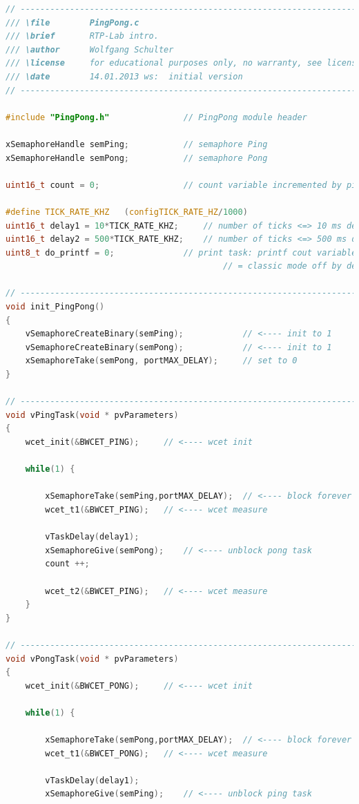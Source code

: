 \os{\newpage}
\begin{lstlisting}[style=mystyle, language=c]
// ----------------------------------------------------------------------------
/// \file		 PingPong.c
/// \brief		 RTP-Lab intro.
/// \author		 Wolfgang Schulter 
/// \license	 for educational purposes only, no warranty, see license.txt
/// \date		 14.01.2013 ws:  initial version
// ----------------------------------------------------------------------------

#include "PingPong.h"  				// PingPong module header

xSemaphoreHandle semPing;			// semaphore Ping
xSemaphoreHandle semPong;			// semaphore Pong

uint16_t count = 0;					// count variable incremented by ping

#define TICK_RATE_KHZ	(configTICK_RATE_HZ/1000)
uint16_t delay1 = 10*TICK_RATE_KHZ;		// number of ticks <=> 10 ms delay as default
uint16_t delay2 = 500*TICK_RATE_KHZ;	// number of ticks <=> 500 ms delay as default
uint8_t do_printf = 0;				// print task: printf cout variable to stdout, if 1
											// = classic mode off by default (we have the GLCD)

// ----------------------------------------------------------------------------
void init_PingPong()
{
	vSemaphoreCreateBinary(semPing);			// <---- init to 1
	vSemaphoreCreateBinary(semPong);			// <---- init to 1
	xSemaphoreTake(semPong, portMAX_DELAY);		// set to 0
}

// ----------------------------------------------------------------------------
void vPingTask(void * pvParameters)
{
	wcet_init(&BWCET_PING);		// <---- wcet init

	while(1) {

		xSemaphoreTake(semPing,portMAX_DELAY);	// <---- block forever until ...
		wcet_t1(&BWCET_PING);	// <---- wcet measure

		vTaskDelay(delay1);
		xSemaphoreGive(semPong);	// <---- unblock pong task
		count ++;

		wcet_t2(&BWCET_PING);	// <---- wcet measure
	}
}

// ----------------------------------------------------------------------------
void vPongTask(void * pvParameters)
{
	wcet_init(&BWCET_PONG);		// <---- wcet init

	while(1) {

		xSemaphoreTake(semPong,portMAX_DELAY);	// <---- block forever until ...
		wcet_t1(&BWCET_PONG);	// <---- wcet measure

		vTaskDelay(delay1);
		xSemaphoreGive(semPing);	// <---- unblock ping task


\end{lstlisting}
